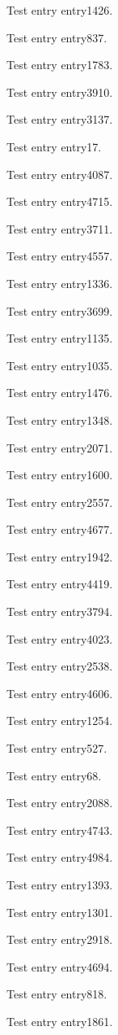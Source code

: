 Test entry \gls{entry1426}.

Test entry \gls{entry837}.

Test entry \gls{entry1783}.

Test entry \gls{entry3910}.

Test entry \gls{entry3137}.

Test entry \gls{entry17}.

Test entry \gls{entry4087}.

Test entry \gls{entry4715}.

Test entry \gls{entry3711}.

Test entry \gls{entry4557}.

Test entry \gls{entry1336}.

Test entry \gls{entry3699}.

Test entry \gls{entry1135}.

Test entry \gls{entry1035}.

Test entry \gls{entry1476}.

Test entry \gls{entry1348}.

Test entry \gls{entry2071}.

Test entry \gls{entry1600}.

Test entry \gls{entry2557}.

Test entry \gls{entry4677}.

Test entry \gls{entry1942}.

Test entry \gls{entry4419}.

Test entry \gls{entry3794}.

Test entry \gls{entry4023}.

Test entry \gls{entry2538}.

Test entry \gls{entry4606}.

Test entry \gls{entry1254}.

Test entry \gls{entry527}.

Test entry \gls{entry68}.

Test entry \gls{entry2088}.

Test entry \gls{entry4743}.

Test entry \gls{entry4984}.

Test entry \gls{entry1393}.

Test entry \gls{entry1301}.

Test entry \gls{entry2918}.

Test entry \gls{entry4694}.

Test entry \gls{entry818}.

Test entry \gls{entry1861}.

